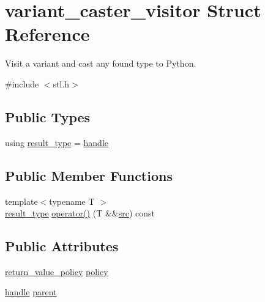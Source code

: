 \hypertarget{structvariant__caster__visitor}{}\section{variant\+\_\+caster\+\_\+visitor Struct Reference}
\label{structvariant__caster__visitor}


Visit a variant and cast any found type to Python.  




{\ttfamily \#include $<$stl.\+h$>$}

\subsection*{Public Types}
\begin{DoxyCompactItemize}
\item 
using \mbox{\hyperlink{structvariant__caster__visitor_ab4ed60d65fd74fe08b5fc6ac714ca9b6}{result\+\_\+type}} = \mbox{\hyperlink{classhandle}{handle}}
\end{DoxyCompactItemize}
\subsection*{Public Member Functions}
\begin{DoxyCompactItemize}
\item 
{\footnotesize template$<$typename T $>$ }\\\mbox{\hyperlink{structvariant__caster__visitor_ab4ed60d65fd74fe08b5fc6ac714ca9b6}{result\+\_\+type}} \mbox{\hyperlink{structvariant__caster__visitor_ab78e15bb76beb4aeb215cefea855f6d0}{operator()}} (T \&\&\mbox{\hyperlink{_s_d_l__opengl__glext_8h_a72e0fdf0f845ded60b1fada9e9195cd7}{src}}) const
\end{DoxyCompactItemize}
\subsection*{Public Attributes}
\begin{DoxyCompactItemize}
\item 
\mbox{\hyperlink{detail_2common_8h_adde72ab1fb0dd4b48a5232c349a53841}{return\+\_\+value\+\_\+policy}} \mbox{\hyperlink{structvariant__caster__visitor_a9cb67ab0573177ee440eb39af186293d}{policy}}
\item 
\mbox{\hyperlink{classhandle}{handle}} \mbox{\hyperlink{structvariant__caster__visitor_a9997bb93f907d349f13930002b7981bf}{parent}}
\end{DoxyCompactItemize}


